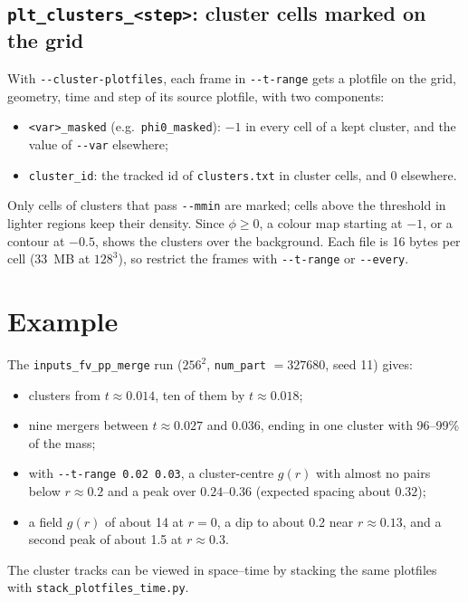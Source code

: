 \documentclass[11pt]{article}
\newcommand{\code}[1]{\texttt{#1}}
\begin{document}
\subsection*{\texorpdfstring{\code{plt\_clusters\_<step>}: cluster cells marked on the grid}{plt_clusters plotfiles}}
With \code{-{}-cluster-plotfiles}, each frame in \code{-{}-t-range} gets a
plotfile on the grid, geometry, time and step of its source plotfile, with two
components:
\begin{itemize}[nosep]
  \item \code{<var>\_masked} (e.g.\ \code{phi0\_masked}): $-1$ in every cell of
        a kept cluster, and the value of \code{-{}-var} elsewhere;
  \item \code{cluster\_id}: the tracked id of \code{clusters.txt} in cluster
        cells, and 0 elsewhere.
\end{itemize}
Only cells of clusters that pass \code{-{}-mmin} are marked; cells above the
threshold in lighter regions keep their density. Since $\phi\ge0$, a colour
map starting at $-1$, or a contour at $-0.5$, shows the clusters over the
background. Each file is 16 bytes per cell (33~MB at $128^3$), so restrict the
frames with \code{-{}-t-range} or \code{-{}-every}.

\section{Example}

The \code{inputs\_fv\_pp\_merge} run ($256^2$, \code{num\_part} $=327680$,
seed 11) gives:
\begin{itemize}
  \item clusters from $t\approx 0.014$, ten of them by $t\approx 0.018$;
  \item nine mergers between $t\approx 0.027$ and $0.036$, ending in one
        cluster with 96--99\% of the mass;
  \item with \code{-{}-t-range 0.02 0.03}, a cluster-centre $g(r)$ with almost
        no pairs below $r\approx 0.2$ and a peak over $0.24$--$0.36$ (expected
        spacing about $0.32$);
  \item a field $g(r)$ of about 14 at $r=0$, a dip to about 0.2 near
        $r\approx 0.13$, and a second peak of about 1.5 at $r\approx 0.3$.
\end{itemize}
The cluster tracks can be viewed in space--time by stacking the same plotfiles
with \code{stack\_\allowbreak plotfiles\_\allowbreak time.py}.
\end{document}
